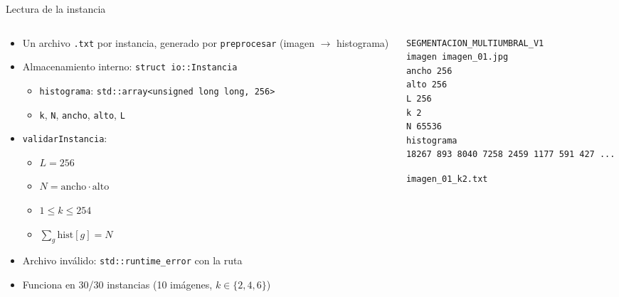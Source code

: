 \documentclass[aspectratio=169, 10pt]{beamer}
\begin{document}
\begin{frame}[fragile]{Lectura de la instancia}
  \begin{columns}[T]
    \begin{column}{0.5\textwidth}
      \begin{itemize}
        \item Un archivo \texttt{.txt} por instancia, generado por \texttt{preprocesar} (imagen $\rightarrow$ histograma)
        \item Almacenamiento interno: \texttt{struct io::Instancia}
        \begin{itemize}
          \item \texttt{histograma}: \texttt{std::array<unsigned long long, 256>}
          \item \texttt{k}, \texttt{N}, \texttt{ancho}, \texttt{alto}, \texttt{L}
        \end{itemize}
        \item \texttt{validarInstancia}:
        \begin{itemize}
          \item $L = 256$
          \item $N = \text{ancho} \cdot \text{alto}$
          \item $1 \leq k \leq 254$
          \item $\sum_g \text{hist}[g] = N$
        \end{itemize}
        \item Archivo inválido: \texttt{std::runtime\_error} con la ruta
        \item Funciona en 30/30 instancias (10 imágenes, $k \in \{2,4,6\}$)
      \end{itemize}
    \end{column}
    \begin{column}{0.5\textwidth}
\begin{verbatim}
SEGMENTACION_MULTIUMBRAL_V1
imagen imagen_01.jpg
ancho 256
alto 256
L 256
k 2
N 65536
histograma
18267 893 8040 7258 2459 1177 591 427 ...
\end{verbatim}
      {\scriptsize \texttt{imagen\_01\_k2.txt}}
    \end{column}
  \end{columns}
\end{frame}
\end{document}
